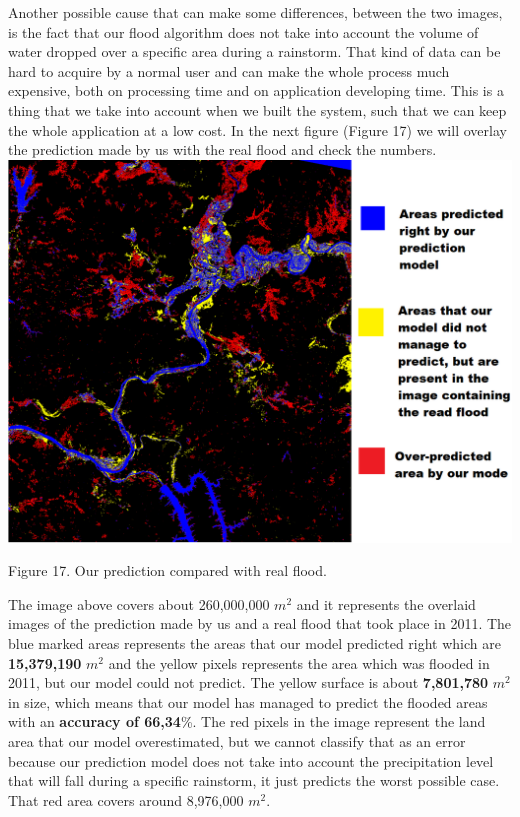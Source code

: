 \documentclass[12pt, a4paper]{report}
\begin{document}
Another possible cause that can make some differences, between the two images, is the fact that our flood algorithm does not take into account the volume of water dropped over a specific area during a rainstorm. That kind of data can be hard to acquire by a normal user and can make the whole process much expensive, both on processing time and on application developing time. This is a thing that we take into account when we built the system, such that we can keep the whole application at a low cost. In the next figure (Figure 17) we will overlay the prediction made by us with the real flood and check the numbers.
\medskip
\includegraphics[scale=0.6, center]{processed_flood_combined.png}
\begin{center}
Figure 17. Our prediction compared with real flood.
\end{center}
\par 

The image above covers about 260,000,000 $m^2$ and it represents the overlaid images of the prediction made by us and a real flood that took place in 2011. The blue marked areas  represents the areas that our model predicted right which are \textbf{15,379,190} $m^2$ and the yellow pixels represents the area which was flooded in 2011, but our model could not predict. The yellow surface is about \textbf{7,801,780} $m^2$ in size, which means that our model has managed to predict the flooded areas with an \textbf{accuracy of 66,34}\%. The red pixels in the image represent the land area that our model overestimated, but we cannot classify that as an error because our prediction model does not take into account the precipitation level that will fall during a specific rainstorm, it just predicts the worst possible case. That red area covers around 8,976,000 $m^2$.
\end{document}
